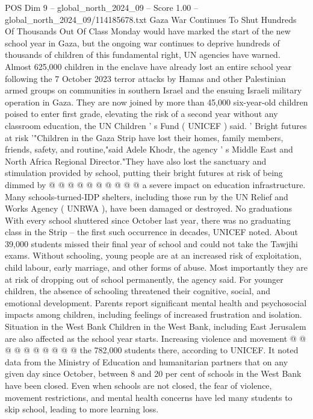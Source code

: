 \begin{textsample}{POS Dim 9 – global\_north\_2024\_09 – Score 1.00 – global\_north\_2024\_09/114185678.txt}  \label{ex:f9_pos_247}
Gaza War Continues To Shut Hundreds Of Thousands Out Of Class Monday would have marked the start of the new school year in Gaza, but the ongoing war continues to deprive hundreds of thousands of children of this fundamental right, UN agencies have warned.
Almost 625,000 children in the enclave have already lost an entire school year following the 7 October 2023 terror attacks by Hamas and other Palestinian armed groups on communities in southern Israel and the ensuing Israeli military operation in Gaza.
They are now joined by more than 45,000 six-year-old children poised to enter first grade, elevating the risk of a second year without any classroom education, the UN Children ' s Fund ( UNICEF ) said. ' Bright futures at risk '"Children in the Gaza Strip have lost their homes, family members, friends, safety, and routine,"said Adele Khodr, the agency ' s Middle East and North Africa Regional Director."They have also lost the sanctuary and stimulation provided by school, putting their bright futures at risk of being dimmed by @ @ @ @ @ @ @ @ @ @ a severe impact on education infrastructure.
Many schools-turned-IDP shelters, including those run by the UN Relief and Works Agency ( UNRWA ), have been damaged or destroyed.
No graduations With every school shuttered since October last year, there was no graduating class in the Strip -- the first such occurrence in decades, UNICEF noted.
About 39,000 students missed their final year of school and could not take the Tawjihi exams.
Without schooling, young people are at an increased risk of exploitation, child labour, early marriage, and other forms of abuse.
Most importantly they are at risk of dropping out of school permanently, the agency said.
For younger children, the absence of schooling threatened their cognitive, social, and emotional development.
Parents report significant mental health and psychosocial impacts among children, including feelings of increased frustration and isolation.
Situation in the West Bank Children in the West Bank, including East Jerusalem are also affected as the school year starts.
Increasing violence and movement @ @ @ @ @ @ @ @ @ @ the 782,000 students there, according to UNICEF.
It noted data from the Ministry of Education and humanitarian partners that on any given day since October, between 8 and 20 per cent of schools in the West Bank have been closed.
Even when schools are not closed, the fear of violence, movement restrictions, and mental health concerns have led many students to skip school, leading to more learning loss.

\end{textsample}
